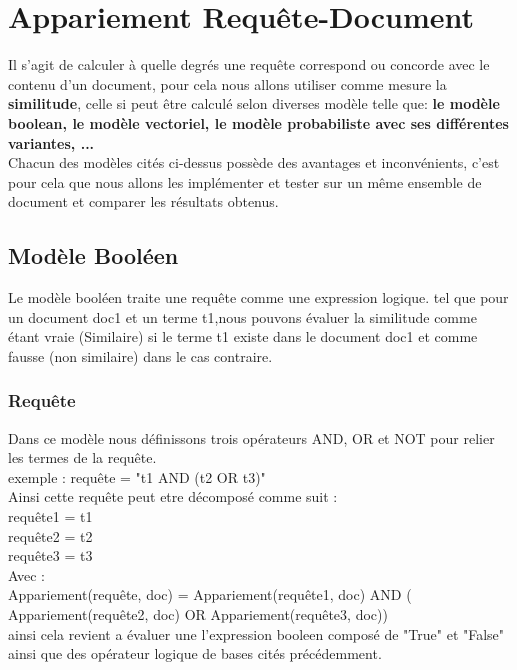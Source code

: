 \documentclass[12pt,a4paper,oneside]{article}
\begin{document}
\newpage

\section{Appariement Requête-Document}
Il s'agit de calculer à quelle degrés une requête correspond ou concorde avec le contenu d'un document, pour cela nous allons utiliser comme mesure la \textbf{similitude}, celle si peut être calculé selon diverses modèle telle que: \textbf{le modèle boolean, le modèle vectoriel, le modèle probabiliste avec ses différentes variantes, ...}\\

Chacun des modèles cités ci-dessus possède des avantages et inconvénients, c'est pour cela que nous allons les implémenter et tester sur un même ensemble de document et comparer les résultats obtenus.

\subsection{Modèle Booléen}
Le modèle booléen traite une requête comme une expression logique. tel que pour un document doc1 et un terme t1,nous pouvons évaluer la similitude comme étant vraie (Similaire) si le terme t1 existe dans le document doc1 et comme fausse (non similaire) dans le cas contraire.

\subsubsection*{Requête}
Dans ce modèle nous définissons trois opérateurs AND, OR et NOT pour relier les termes de la requête.\\
exemple : requête = "t1 AND (t2 OR t3)"\\
Ainsi cette requête peut etre décomposé comme suit : \\
requête1 = t1\\
requête2 = t2\\
requête3 = t3\\

Avec : \\
Appariement(requête, doc) = Appariement(requête1, doc) AND ( Appariement(requête2, doc) OR Appariement(requête3, doc))\\

ainsi cela revient a évaluer une l'expression booleen composé de "True" et "False" ainsi que des opérateur logique de bases cités précédemment.
\end{document}
